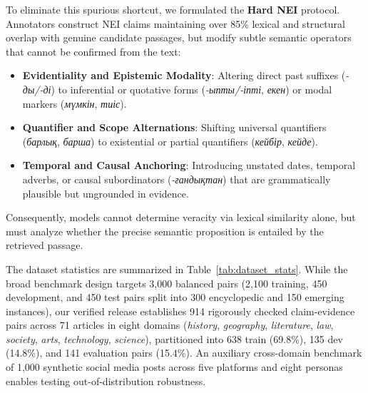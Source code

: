 To eliminate this spurious shortcut, we formulated the \textbf{Hard NEI} protocol. Annotators construct NEI claims maintaining over 85\% lexical and structural overlap with genuine candidate passages, but modify subtle semantic operators that cannot be confirmed from the text:
\begin{itemize}[leftmargin=*,nosep]
    \item \textbf{Evidentiality and Epistemic Modality}: Altering direct past suffixes (\textit{-ды/-ді}) to inferential or quotative forms (\textit{-ыпты/-іпті}, \textit{екен}) or modal markers (\textit{мүмкін}, \textit{тиіс}).
    \item \textbf{Quantifier and Scope Alternations}: Shifting universal quantifiers (\textit{барлық}, \textit{барша}) to existential or partial quantifiers (\textit{кейбір}, \textit{кейде}).
    \item \textbf{Temporal and Causal Anchoring}: Introducing unstated dates, temporal adverbs, or causal subordinators (\textit{-ғандықтан}) that are grammatically plausible but ungrounded in evidence.
\end{itemize}
Consequently, models cannot determine veracity via lexical similarity alone, but must analyze whether the precise semantic proposition is entailed by the retrieved passage.

\begin{table}[t]
\centering
\small
\caption{Distribution of claim-evidence pairs across splits in the Kazakh-FEVER benchmark.}
\label{tab:dataset_stats}
\end{table}

The dataset statistics are summarized in Table~\ref{tab:dataset_stats}. While the broad benchmark design targets 3,000 balanced pairs (2,100 training, 450 development, and 450 test pairs split into 300 encyclopedic and 150 emerging instances), our verified release establishes 914 rigorously checked claim-evidence pairs across 71 articles in eight domains (\textit{history}, \textit{geography}, \textit{literature}, \textit{law}, \textit{society}, \textit{arts}, \textit{technology}, \textit{science}), partitioned into 638 train (69.8\%), 135 dev (14.8\%), and 141 evaluation pairs (15.4\%). An auxiliary cross-domain benchmark of 1,000 synthetic social media posts across five platforms and eight personas enables testing out-of-distribution robustness.
